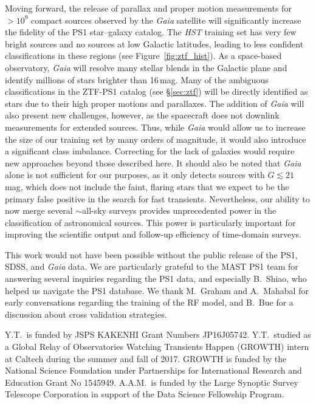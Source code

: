 \documentclass[twocolumn]{aastex62}
\begin{document}
\begin{CJK*}{UTF8}{gbsn}
Moving forward, the release of parallax and proper motion measurements for
$> 10^{9}$ compact sources observed by the \textit{Gaia} satellite
\citep{GaiaDR2} will significantly increase the fidelity of the PS1
star--galaxy catalog. The \textit{HST} training set has very few bright
sources and no sources at low Galactic latitudes, leading to less confident
classifications in these regions (see Figure~\ref{fig:ztf_hist}). As a
space-based observatory, \textit{Gaia} will resolve many stellar blends in
the Galactic plane and identify millions of stars brighter than 16\,mag.
Many of the ambiguous classifications in the ZTF-PS1 catalog (see
\S\ref{sec:ztf}) will be directly identified as stars due to their high
proper motions and parallaxes. The addition of \textit{Gaia} will also
present new challenges, however, as the spacecraft does not downlink
measurements for extended sources. Thus, while \textit{Gaia} would allow us
to increase the size of our training set by many orders of magnitude, it
would also introduce a significant class imbalance. Correcting for the lack
of galaxies would require new approaches beyond those described here. It
should also be noted that \textit{Gaia} alone is not sufficient for our
purposes, as it only detects sources with $G \lesssim 21$\,mag, which does
not include the faint, flaring stars that we expect to be the primary false
positive in the search for fast transients. Nevertheless, our ability to now
merge several $\sim$all-sky surveys provides unprecedented power in the
classification of astronomical sources. This power is particularly important
for improving the scientific output and follow-up efficiency of time-domain
surveys.

\acknowledgements

This work would not have been possible without the public release of the
PS1, SDSS, and \textit{Gaia} data. We are particularly grateful to the MAST
PS1 team for answering several inquiries regarding the PS1 data, and
especially B.~Shiao, who helped us navigate the PS1 database. We thank
M.~Graham and A.~Mahabal for early conversations regarding the training of
the RF model, and B.~Bue for a discussion about cross validation strategies.

Y.T.\ is funded by JSPS KAKENHI Grant Numbers JP16J05742. Y.T.\ studied as a
Global Relay of Observatories Watching Transients Happen (GROWTH) intern at
Caltech during the summer and fall of 2017. GROWTH is funded by the National
Science Foundation under Partnerships for International Research and
Education Grant No 1545949. A.A.M.\ is funded by the Large Synoptic Survey
Telescope Corporation in support of the Data Science Fellowship Program.








\end{CJK*}
\end{document}
